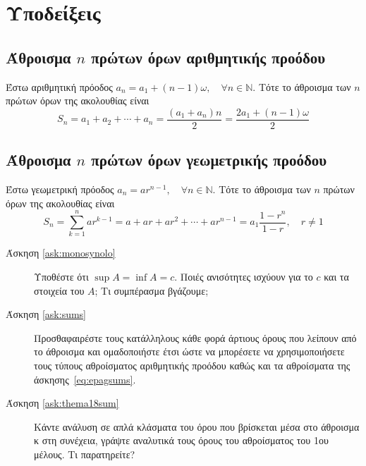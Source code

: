   \vspace{\baselineskip}

  \section*{Υποδείξεις} 

  \subsection*{Άθροισμα $n$ πρώτων όρων αριθμητικής προόδου}
  Έστω αριθμητική πρόοδος $a_{n} = a_{1} + (n-1)\omega, \quad \forall n \in \mathbb{N}$.
  Τότε το άθροισμα των $n$ πρώτων όρων της ακολουθίας είναι
  \[
    S_{n} = a_{1} + a_{2} + \cdots + a_{n} = \frac{(a_{1} + a_{n})n}{2} =
    \frac{2a_{1}+(n-1)\omega}{2}
  \]
  \subsection*{Άθροισμα $n$ πρώτων όρων γεωμετρικής προόδου}
  Έστω γεωμετρική πρόοδος $ a_{n} = a r^{n-1}, \quad \forall n \in \mathbb{N} $.
  Τότε το άθροισμα των $n$ πρώτων όρων της ακολουθίας είναι
  \[
    S_{n} = \sum_{k=1}^{n} ar^{k-1} = a + ar + ar^{2} + \cdots + ar^{n-1} = 
    a_{1}\frac{1 - r^{n}}{1-r}, \quad r \neq 1 
  \] 

  \begin{description}
    \item [Άσκηση \ref{ask:monosynolo}] Υποθέστε ότι $ \sup A = \inf A = c
      $. Ποιές ανισότητες ισχύουν για το $c$ και τα στοιχεία του $A$; 
      Τι συμπέρασμα βγάζουμε;

    \item [Άσκηση \ref{ask:sums}] Προσθαφαιρέστε τους κατάλληλους κάθε φορά  
      άρτιους όρους που λείπουν από το άθροισμα και ομαδοποιήστε έτσι ώστε να 
      μπορέσετε να χρησιμοποιήσετε τους τύπους αθροίσματος αριθμητικής προόδου 
      καθώς και τα αθροίσματα της άσκησης~\ref{eq:epagsums}.

    \item [Άσκηση \ref{ask:thema18sum}] Κάντε ανάλυση σε απλά κλάσματα 
      του όρου που βρίσκεται μέσα στο άθροισμα κ στη συνέχεια, γράψτε
      αναλυτικά τους όρους του αθροίσματος του 1ου μέλους. Τι παρατηρείτε?
  \end{description}
  
